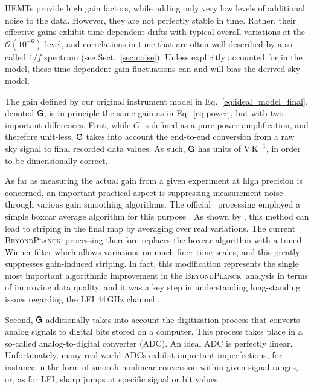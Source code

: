 \documentclass[twocolumn]{aa}
\renewcommand{\G}[0]{\tens{G}}
\newcommand{\BP}{\textsc{BeyondPlanck}}
\begin{document}
HEMTs provide high gain factors, while adding only very low levels of
additional noise to the data. However, they are not perfectly stable
in time. Rather, their effective gains exhibit time-dependent drifts
with typical overall variations at the $\mathcal{O}(10^{-6})$ level,
and correlations in time that are often well described by a so-called
$1/f$ spectrum (see Sect.~\ref{sec:noise}). Unless explicitly
accounted for in the model, these time-dependent gain fluctuations can
and will bias the derived sky model.

The gain defined by our original instrument model in
Eq.~\eqref{eq:ideal_model_final}, denoted $\G$, is in principle the same
gain as in Eq.~\eqref{eq:power}, but with two important
differences. First, while $G$ is defined as a pure power
amplification, and therefore unit-less, $\G$ takes into account the
end-to-end conversion from a raw sky signal to final recorded data
values. As such, $\G$ has units of $\mathrm{V}\,\mathrm{K}^{-1}$, in
order to be dimensionally correct.

As far as measuring the actual gain from a given experiment at high
precision is concerned, an important practical aspect is suppressing
measurement noise through various gain smoothing algorithms. The
official \Planck\ processing employed a simple boxcar average
algorithm for this purpose \citep{planck2014-a03,planck2016-l06}. As
shown by \citet{bp07}, this method can lead to striping in the final
map by averaging over real variations. The current \BP\ processing
therefore replaces the boxcar algorithm with a tuned Wiener filter
which allows variations on much finer time-scales, and this greatly
suppresses gain-induced striping. In fact, this modification
represents the single most important algorithmic improvement in the
\BP\ analysis in terms of improving data quality, and it was a key
step in understanding long-standing issues regarding the LFI 44\,GHz
channel \citep{planck2016-l02,planck2016-l05}.

Second, $\G$ additionally takes into account the digitization process
that converts analog signals to digital bits stored on a
computer. This process takes place in a so-called analog-to-digital
converter (ADC). An ideal ADC is perfectly linear. Unfortunately, many
real-world ADCs exhibit important imperfections, for instance in the
form of smooth nonlinear conversion within given signal ranges, or,
as for LFI, sharp jumps at specific signal or bit values.
\end{document}
